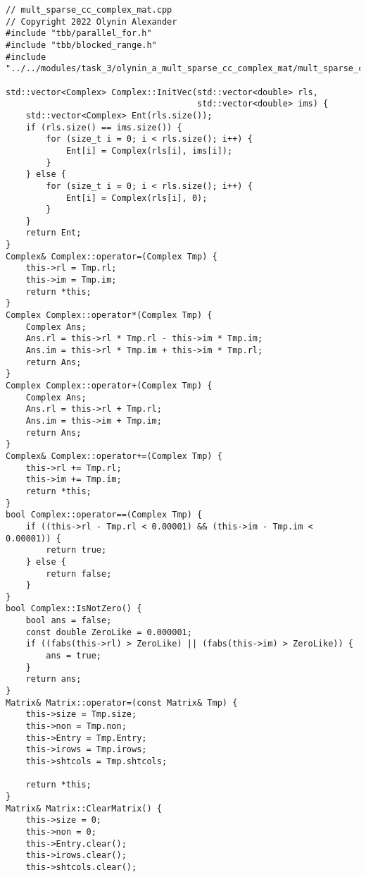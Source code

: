 \documentclass[12pt]{report}
\begin{document}
\begin{lstlisting}
// mult_sparse_cc_complex_mat.cpp
// Copyright 2022 Olynin Alexander
#include "tbb/parallel_for.h"
#include "tbb/blocked_range.h"
#include "../../modules/task_3/olynin_a_mult_sparse_cc_complex_mat/mult_sparse_cc_complex_mat.h"

std::vector<Complex> Complex::InitVec(std::vector<double> rls,
                                      std::vector<double> ims) {
    std::vector<Complex> Ent(rls.size());
    if (rls.size() == ims.size()) {
        for (size_t i = 0; i < rls.size(); i++) {
            Ent[i] = Complex(rls[i], ims[i]);
        }
    } else {
        for (size_t i = 0; i < rls.size(); i++) {
            Ent[i] = Complex(rls[i], 0);
        }
    }
    return Ent;
}
Complex& Complex::operator=(Complex Tmp) {
    this->rl = Tmp.rl;
    this->im = Tmp.im;
    return *this;
}
Complex Complex::operator*(Complex Tmp) {
    Complex Ans;
    Ans.rl = this->rl * Tmp.rl - this->im * Tmp.im;
    Ans.im = this->rl * Tmp.im + this->im * Tmp.rl;
    return Ans;
}
Complex Complex::operator+(Complex Tmp) {
    Complex Ans;
    Ans.rl = this->rl + Tmp.rl;
    Ans.im = this->im + Tmp.im;
    return Ans;
}
Complex& Complex::operator+=(Complex Tmp) {
    this->rl += Tmp.rl;
    this->im += Tmp.im;
    return *this;
}
bool Complex::operator==(Complex Tmp) {
    if ((this->rl - Tmp.rl < 0.00001) && (this->im - Tmp.im < 0.00001)) {
        return true;
    } else {
        return false;
    }
}
bool Complex::IsNotZero() {
    bool ans = false;
    const double ZeroLike = 0.000001;
    if ((fabs(this->rl) > ZeroLike) || (fabs(this->im) > ZeroLike)) {
        ans = true;
    }
    return ans;
}
Matrix& Matrix::operator=(const Matrix& Tmp) {
    this->size = Tmp.size;
    this->non = Tmp.non;
    this->Entry = Tmp.Entry;
    this->irows = Tmp.irows;
    this->shtcols = Tmp.shtcols;

    return *this;
}
Matrix& Matrix::ClearMatrix() {
    this->size = 0;
    this->non = 0;
    this->Entry.clear();
    this->irows.clear();
    this->shtcols.clear();


\end{lstlisting}
\end{document}
